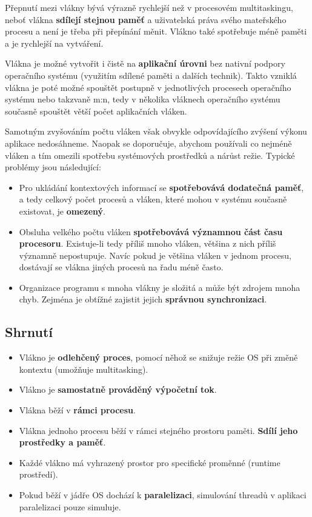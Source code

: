 Přepnutí mezi vlákny bývá výrazně rychlejší než v procesovém multitaskingu, neboť vlákna \textbf{sdílejí stejnou paměť }a uživatelská práva svého mateřského procesu a není je třeba při přepínání měnit. Vlákno také spotřebuje méně paměti a je rychlejší na vytváření.

Vlákna je možné vytvořit i čistě na \textbf{aplikační úrovni} bez nativní podpory operačního systému (využitím sdílené paměti a dalších technik). Takto vzniklá vlákna je poté možné spouštět postupně v jednotlivých procesech operačního systému nebo takzvaně m:n, tedy v několika vláknech operačního systému současně spouštět větší počet aplikačních vláken.

Samotným zvyšováním počtu vláken však obvykle odpovídajícího zvýšení výkonu aplikace nedosáhneme. Naopak se doporučuje, abychom používali co nejméně vláken a tím omezili spotřebu systémových prostředků a nárůst režie. Typické problémy jsou následující:

\begin{itemize}
    \item Pro ukládání kontextových informací se \textbf{spotřebovává dodatečná paměť}, a tedy celkový počet procesů a vláken, které mohou v systému současně existovat, je \textbf{omezený}.
    \item Obsluha velkého počtu vláken \textbf{spotřebovává významnou část času procesoru}. Existuje-li tedy příliš mnoho vláken, většina z nich příliš významně nepostupuje. Navíc pokud je většina vláken v jednom procesu, dostávají se vlákna jiných procesů na řadu méně často.
    \item Organizace programu s mnoha vlákny je složitá a může být zdrojem mnoha chyb. Zejména je obtížné zajistit jejich \textbf{správnou synchronizaci}.
\end{itemize}

\subsection{Shrnutí}
\begin{itemize}
    \item Vlákno je \textbf{odlehčený proces}, pomocí něhož se snižuje režie OS při změně kontextu (umožňuje multitasking).
    \item Vlákno je \textbf{samostatně prováděný výpočetní tok}.
    \item Vlákna běží v \textbf{rámci procesu}.
    \item Vlákna jednoho procesu běží v rámci stejného prostoru paměti. \textbf{Sdílí jeho prostředky a paměť}.
    \item Každé vlákno má vyhrazený prostor pro specifické proměnné (runtime prostředí).
    \item Pokud běží v jádře OS dochází k \textbf{paralelizaci}, simulování threadů v aplikaci paralelizaci pouze simuluje.
\end{itemize}

